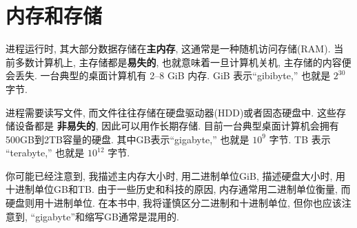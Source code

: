 \documentclass[12pt]{book}
\begin{document}
{%
\section{内存和存储}
%

进程运行时, 其大部分数据存储在{\bf 主内存}, 这通常是一种随机访问存储(RAM).
当前多数计算机上, 主存储都是{\bf 易失的}, 也就意味着一旦计算机关机, 
主存储的内容便会丢失. 一台典型的桌面计算机有 2--8 GiB 内存.
GiB 表示``gibibyte,'' 也就是 $2^{30}$ 字节.

进程需要读写文件, 而文件往往存储在硬盘驱动器(HDD)或者固态硬盘中.
这些存储设备都是 {\bf 非易失的}, 因此可以用作长期存储.
目前一台典型桌面计算机会拥有500GB到2TB容量的硬盘.
其中GB表示``gigabyte,'' 也就是 $10^9$ 字节.
TB 表示 ``terabyte,'' 也就是 $10^{12}$ 字节.

%
你可能已经注意到, 我描述主内存大小时, 用二进制单位GiB,
描述硬盘大小时, 用十进制单位GB和TB.
由于一些历史和科技的原因, 内存通常用二进制单位衡量, 而硬盘则用十进制单位.
在本书中, 我将谨慎区分二进制和十进制单位,
但你也应该注意到, ``gigabyte''和缩写GB通常是混用的.

}
\end{document}
